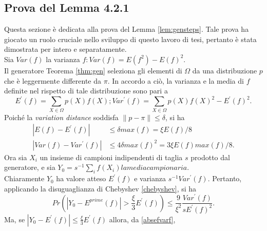 \subsection{Prova del Lemma 4.2.1}\label{ssec:lemmaproof}
Questa sezione è dedicata alla prova del Lemma \ref{lem:gensteps}. Tale prova ha giocato un ruolo cruciale nello sviluppo di questo lavoro di tesi, pertanto è stata dimostrata per intero e separatamente.\\
Sia $Var(f)$ la varianza $f: Var(f) = E(f^2) - E(f)^2$.\\
Il generatore Teorema \ref{thm:gen} seleziona gli elementi di $\Omega$ da una distribuzione $p$ che è leggermente differente da $\pi$. In accordo a ciò, la varianza e la media di $f$ definite nel rispetto di tale distribuzione sono pari a
\begin{equation}
	E^{\prime}(f) = \sum_{X \in \Omega}{p(X)f(X)};
	Var^{\prime}(f) = \sum_{X \in \Omega}{p(X)f(X)^2 - E^{\prime}(f)^2}.
	\label{efvarf}
\end{equation}
Poiché la \textit{variation distance} soddisfa $\|p-\pi\| \leq \delta$, si ha
\begin{align}
	|E(f) - E^{\prime}(f)| &\leq \delta max(f) = \xi E(f)/8\\
	|Var(f) - Var^{\prime}(f)| &\leq 4\delta max(f)^2 = 3\xi E(f) max(f)/8.
	\label{absefvarf}
\end{align}
Ora sia ${X_i}$ un insieme di campioni indipendenti di taglia $s$ prodotto dal generatore, e sia $Y_0 = s^{-1}\sum_i{f(X_i)} la media campionaria$.\\
Chiaramente $Y_0$ ha valore atteso $E^{\prime}(f)$ e varianza $s^{-1}Var^{\prime}(f)$. Pertanto, applicando la disuguaglianza di Chebyshev \ref{chebyshev}, si ha
\begin{equation}
	Pr\left( \left|Y_0 - E^{prime}(f)\right| > \frac{\xi}{3}E^{\prime}(f)\right) \leq \frac{9}{\xi^2}\frac{Var^{\prime}(f)}{sE^{\prime}(f)^2}.
	\label{pryef}
\end{equation}
Ma, se $|Y_0 - E^{\prime}(f)| \leq \frac{\xi}{3}E^{\prime}(f)$ allora, da \ref{absefvarf},

